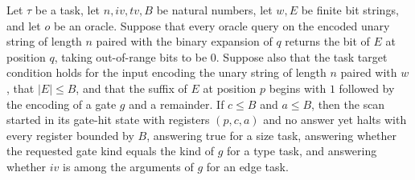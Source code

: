 \begin{lemma}
\label{BoolCircuit.AdjScan.hitGate}
\leanok
{}
Let $\tau$ be a task, let $n,iv,tv,B$ be natural numbers, let $w,E$ be finite bit
strings, and let $o$ be an oracle. Suppose that every oracle query on the encoded unary
string of length $n$ paired with the binary expansion of $q$ returns the bit of $E$ at
position $q$, taking out-of-range bits to be $0$. Suppose also that the task target
condition holds for the input encoding the unary string of length $n$ paired with $w$,
that $|E|\le B$, and that the suffix of $E$ at position $p$ begins with $1$ followed by
the encoding of a gate $g$ and a remainder. If $c\le B$ and $a\le B$, then the scan
started in its gate-hit state with registers $(p,c,a)$ and no answer yet halts with
every register bounded by $B$, answering true for a size task, answering whether the
requested gate kind equals the kind of $g$ for a type task, and answering whether $iv$
is among the arguments of $g$ for an edge task.
\end{lemma}

